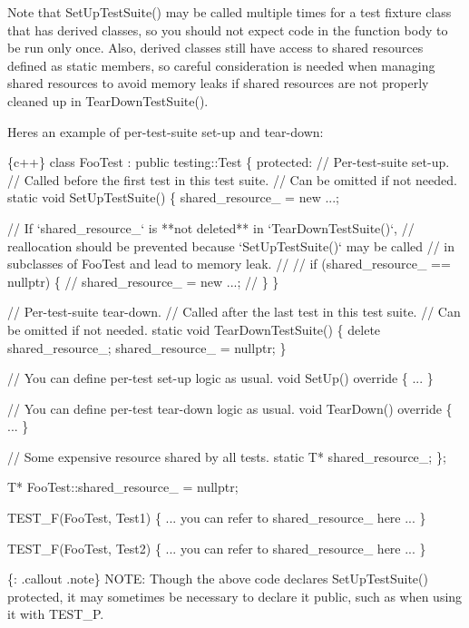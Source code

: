 Note that {\ttfamily Set\+Up\+Test\+Suite()} may be called multiple times for a test fixture class that has derived classes, so you should not expect code in the function body to be run only once. Also, derived classes still have access to shared resources defined as static members, so careful consideration is needed when managing shared resources to avoid memory leaks if shared resources are not properly cleaned up in {\ttfamily Tear\+Down\+Test\+Suite()}.

Here\textquotesingle{}s an example of per-\/test-\/suite set-\/up and tear-\/down\+:


\begin{DoxyCode}
\{c++\}
class FooTest : public testing::Test \{
 protected:
  // Per-test-suite set-up.
  // Called before the first test in this test suite.
  // Can be omitted if not needed.
  static void SetUpTestSuite() \{
    shared\_resource\_ = new ...;

    // If `shared\_resource\_` is **not deleted** in `TearDownTestSuite()`,
    // reallocation should be prevented because `SetUpTestSuite()` may be called
    // in subclasses of FooTest and lead to memory leak.
    //
    // if (shared\_resource\_ == nullptr) \{
    //   shared\_resource\_ = new ...;
    // \}
  \}

  // Per-test-suite tear-down.
  // Called after the last test in this test suite.
  // Can be omitted if not needed.
  static void TearDownTestSuite() \{
    delete shared\_resource\_;
    shared\_resource\_ = nullptr;
  \}

  // You can define per-test set-up logic as usual.
  void SetUp() override \{ ... \}

  // You can define per-test tear-down logic as usual.
  void TearDown() override \{ ... \}

  // Some expensive resource shared by all tests.
  static T* shared\_resource\_;
\};

T* FooTest::shared\_resource\_ = nullptr;

TEST\_F(FooTest, Test1) \{
  ... you can refer to shared\_resource\_ here ...
\}

TEST\_F(FooTest, Test2) \{
  ... you can refer to shared\_resource\_ here ...
\}
\end{DoxyCode}


\{\+: .callout .note\} N\+O\+TE\+: Though the above code declares {\ttfamily Set\+Up\+Test\+Suite()} protected, it may sometimes be necessary to declare it public, such as when using it with {\ttfamily T\+E\+S\+T\+\_\+P}.

